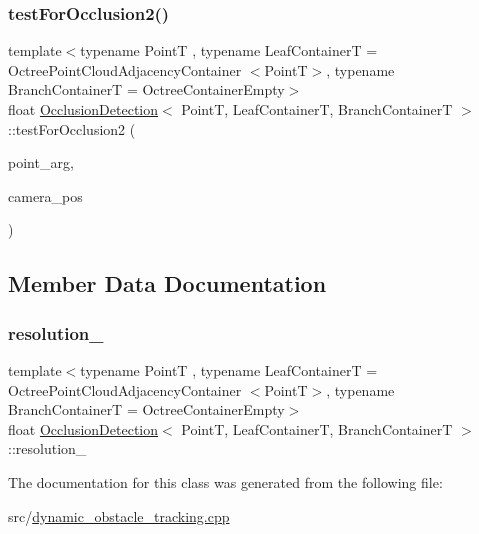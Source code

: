 \subsubsection{\texorpdfstring{test\+For\+Occlusion2()}{testForOcclusion2()}}
{\footnotesize\ttfamily template$<$typename PointT , typename Leaf\+ContainerT  = Octree\+Point\+Cloud\+Adjacency\+Container $<$\+Point\+T$>$, typename Branch\+ContainerT  = Octree\+Container\+Empty$>$ \\
float \hyperlink{classOcclusionDetection}{Occlusion\+Detection}$<$ PointT, Leaf\+ContainerT, Branch\+ContainerT $>$\+::test\+For\+Occlusion2 (\begin{DoxyParamCaption}\item[{const PointT \&}]{point\+\_\+arg,  }\item[{const pcl\+::\+Point\+X\+YZ \&}]{camera\+\_\+pos }\end{DoxyParamCaption})\hspace{0.3cm}{\ttfamily [inline]}}



\subsection{Member Data Documentation}
\mbox{\label{classOcclusionDetection_a1ae68b099e17672264520484de90d0c0}} 
\subsubsection{\texorpdfstring{resolution\+\_\+}{resolution\_}}
{\footnotesize\ttfamily template$<$typename PointT , typename Leaf\+ContainerT  = Octree\+Point\+Cloud\+Adjacency\+Container $<$\+Point\+T$>$, typename Branch\+ContainerT  = Octree\+Container\+Empty$>$ \\
float \hyperlink{classOcclusionDetection}{Occlusion\+Detection}$<$ PointT, Leaf\+ContainerT, Branch\+ContainerT $>$\+::resolution\+\_\+\hspace{0.3cm}{\ttfamily [private]}}



The documentation for this class was generated from the following file\+:\begin{DoxyCompactItemize}
\item 
src/\hyperlink{dynamic__obstacle__tracking_8cpp}{dynamic\+\_\+obstacle\+\_\+tracking.\+cpp}\end{DoxyCompactItemize}
